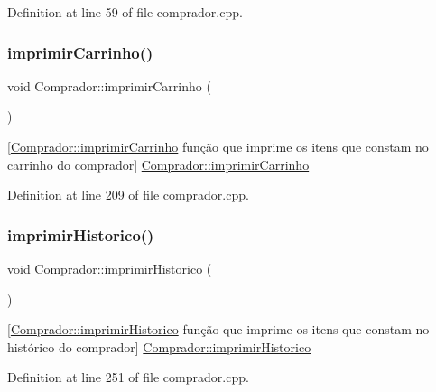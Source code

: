Definition at line 59 of file comprador.\+cpp.

\mbox{\label{class_comprador_a22479e83d85331787d699d74c1307ad2}} 
\subsubsection{\texorpdfstring{imprimir\+Carrinho()}{imprimirCarrinho()}}
{\footnotesize\ttfamily void Comprador\+::imprimir\+Carrinho (\begin{DoxyParamCaption}{ }\end{DoxyParamCaption})}

\mbox{[}\hyperlink{class_comprador_a22479e83d85331787d699d74c1307ad2}{Comprador\+::imprimir\+Carrinho} função que imprime os itens que constam no carrinho do comprador\mbox{]}  \hyperlink{class_comprador_a22479e83d85331787d699d74c1307ad2}{Comprador\+::imprimir\+Carrinho} 

Definition at line 209 of file comprador.\+cpp.

\mbox{\label{class_comprador_a4c67775d6f1e703278569ebf9cc20a79}} 
\subsubsection{\texorpdfstring{imprimir\+Historico()}{imprimirHistorico()}}
{\footnotesize\ttfamily void Comprador\+::imprimir\+Historico (\begin{DoxyParamCaption}{ }\end{DoxyParamCaption})}

\mbox{[}\hyperlink{class_comprador_a4c67775d6f1e703278569ebf9cc20a79}{Comprador\+::imprimir\+Historico} função que imprime os itens que constam no histórico do comprador\mbox{]}  \hyperlink{class_comprador_a4c67775d6f1e703278569ebf9cc20a79}{Comprador\+::imprimir\+Historico} 

Definition at line 251 of file comprador.\+cpp.

\mbox{\label{class_comprador_a511093b891d5c4202cee1f25ccbed66e}} 
